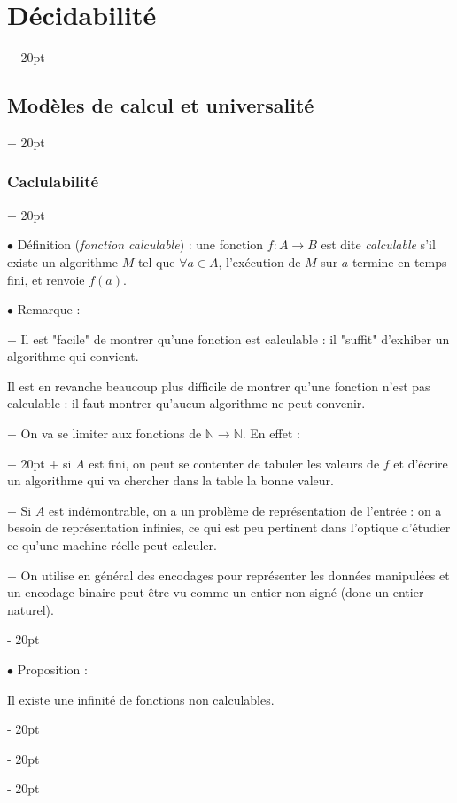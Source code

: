 \documentclass[a4paper, 12pt, twoside]{article}
\newcommand{\N}{\mathbb{N}} %
\newcommand{\ind}[1][20pt]{\advance\leftskip + #1}
\newcommand{\deind}[1][20pt]{\advance\leftskip - #1}
\newenvironment{indt}[2][20pt]{#2 \par \ind[#1]}{\par \deind} %
\begin{document}
\begin{indt}{\section{Décidabilité}}
\begin{indt}{\subsection{Modèles de calcul et universalité}}
\begin{indt}{\subsubsection{Caclulabilité}}
                \vspace{12pt}
                
                $\bullet$ Définition (\emph{fonction calculable}) : une fonction $f : A \longrightarrow B$ est dite \emph{calculable} s'il existe un algorithme $M$ tel que $\forall a \in A$, l'exécution de $M$ sur $a$ termine en temps fini, et renvoie $f(a)$.

                \vspace{12pt}
                
                $\bullet$ Remarque :

                $-$ Il est "facile" de montrer qu'une fonction est calculable : il "suffit" d'exhiber un algorithme qui convient.

                Il est en revanche beaucoup plus difficile de montrer qu'une fonction n'est pas calculable : il faut montrer qu'aucun algorithme ne peut convenir.

                \vspace{6pt}
                
                \begin{indt}{$-$ On va se limiter aux fonctions de $\N \longrightarrow \N$. En effet :}
                    $+$ si $A$ est fini, on peut se contenter de tabuler les valeurs de $f$ et d'écrire un algorithme qui va chercher dans la table la bonne valeur.

                    $+$ Si $A$ est indémontrable, on a un problème de représentation de l'entrée : on a besoin de représentation infinies, ce qui est peu pertinent dans l'optique d'étudier ce qu'une machine réelle peut calculer.

                    $+$ On utilise en général des encodages pour représenter les données manipulées et un encodage binaire peut être vu comme un entier non signé (donc un entier naturel).
                \end{indt}

                \vspace{12pt}
                
                $\bullet$ Proposition :

                \begin{emphBox}
                    Il existe une infinité de fonctions non calculables.
                \end{emphBox}

                \vspace{6pt}
                

\end{indt}
\end{indt}
\end{indt}
\end{document}
